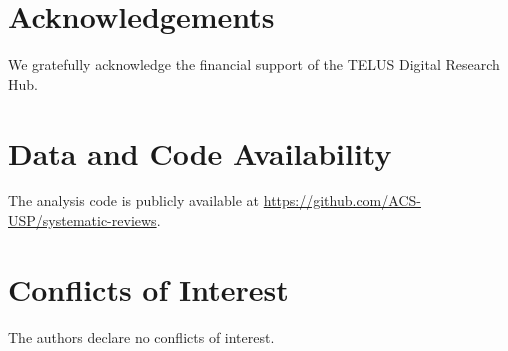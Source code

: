 \documentclass[12pt,a4paper]{article}
\begin{document}
\begin{abstract}
\noindent\textbf{Conclusions:}
Frontier LLMs can perform zero-shot RoB~1.0 assessment at accuracy levels
broadly consistent with estimates of human inter-rater variability for this task
\citep{Hartling2013}, though direct comparison on this specific corpus was not
performed; no single model dominates across all metrics, and no consistent
advantage was found for single-call over per-domain inference.
The primary practical distinction between inference modes is computational:
single-call reduces inference calls by 7$\times$ without a reliable accuracy
trade-off.
All analyses are exploratory; results should be interpreted as directional
benchmarks rather than definitive rankings.

\noindent\textbf{Keywords:} risk of bias; systematic review; large language
models; natural language processing; Cochrane; evidence synthesis; automation
\end{abstract}

\newpage









\section*{Acknowledgements}
We gratefully acknowledge the financial support of the TELUS Digital Research Hub.

\section*{Data and Code Availability}
The analysis code is publicly available at
\url{https://github.com/ACS-USP/systematic-reviews}.

\section*{Conflicts of Interest}
The authors declare no conflicts of interest.




\newpage

\end{document}
